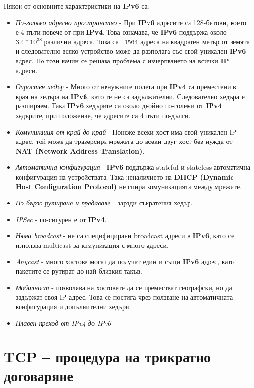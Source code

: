 \documentclass[fleqn,12pt]{article}
\begin{document}
\begin{flushleft}
Някои от основните характеристики на \textbf{IPv6} са:
\begin{itemize}
    \item \textit{По-голямо адресно пространство} - При \textbf{IPv6} адресите са 128-битови, което е 4 пъти повече от при \textbf{IPv4}.
    Това означава, че \textbf{IPv6} поддържа около $3.4 * 10^{38}$ различни адреса.
    Това са ~1564 адреса на квадратен метър от земята и следователно всяко устройство може да разполага със свой уникален \textbf{IPv6} адрес.
    По този начин се решава проблема с изчерпването на всички \textbf{IP} адреси.
    \item \textit{Опростен хедър} - Много от ненужните полета при \textbf{IPv4} са преместени в края на хедъра на \textbf{IPv6}, като те не са задължителни.
    Следователно хедъра е разширяем.
    Така \textbf{IPv6} хедърите са около двойно по-големи от \textbf{IPv4} хедърите, при положение, че адресите са 4 пъти по-дълги.
    \item \textit{Комуникация от край-до-край} - Понеже всеки хост има свой уникален IP адрес, той може да траверсира мрежата до всеки друг хост без нужда от \textbf{NAT (Network Address Translation)}.
    \item \textit{Автоматична конфигурация} - \textbf{IPv6} поддържа stateful и stateless автоматична конфигурация на устройствата.
    Така неналичието на \textbf{DHCP (Dynamic Host Configuration Protocol)} не спира комуникацията между мрежите.
    \item \textit{По-бързо рутиране и предаване} - заради съкратения хедър.
    \item \textit{IPSec} - по-сигурен е от \textbf{IPv4}.
    \item \textit{Няма broadcast} - не са специфицирани broadcast адреси в \textbf{IPv6}, като се използва multicast за комуникация с много адреси.
    \item \textit{Anycast} - много хостове могат да получат един и същи \textbf{IPv6} адрес, като пакетите се рутират до най-близкия такъв.
    \item \textit{Мобилност} - позволява на хостовете да се преместват географски, но да задържат своя IP адрес.
    Това се постига чрез ползване на автоматичната конфигурация и допълнителни хедъри.
    \item \textit{Плавен преход от IPv4 до IPv6}
\end{itemize}

\section{TCP – процедура на трикратно договаряне}


\end{flushleft}
\end{document}
